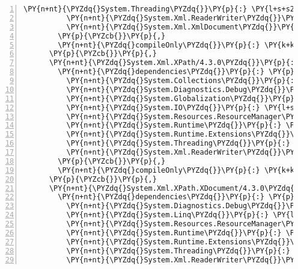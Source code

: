 \begin{Verbatim}[commandchars=\\\{\},numbers=left,firstnumber=1,stepnumber=1,numberblanklines=0]
          \PY{n+nt}{\PYZdq{}System.Threading\PYZdq{}}\PY{p}{:} \PY{l+s+s2}{\PYZdq{}4.3.0\PYZdq{}}\PY{p}{,}
          \PY{n+nt}{\PYZdq{}System.Xml.ReaderWriter\PYZdq{}}\PY{p}{:} \PY{l+s+s2}{\PYZdq{}4.3.0\PYZdq{}}\PY{p}{,}
          \PY{n+nt}{\PYZdq{}System.Xml.XmlDocument\PYZdq{}}\PY{p}{:} \PY{l+s+s2}{\PYZdq{}4.3.0\PYZdq{}}
        \PY{p}{\PYZcb{}}\PY{p}{,}
        \PY{n+nt}{\PYZdq{}compileOnly\PYZdq{}}\PY{p}{:} \PY{k+kc}{true}
      \PY{p}{\PYZcb{}}\PY{p}{,}
      \PY{n+nt}{\PYZdq{}System.Xml.XPath/4.3.0\PYZdq{}}\PY{p}{:} \PY{p}{\PYZob{}}
        \PY{n+nt}{\PYZdq{}dependencies\PYZdq{}}\PY{p}{:} \PY{p}{\PYZob{}}
          \PY{n+nt}{\PYZdq{}System.Collections\PYZdq{}}\PY{p}{:} \PY{l+s+s2}{\PYZdq{}4.3.0\PYZdq{}}\PY{p}{,}
          \PY{n+nt}{\PYZdq{}System.Diagnostics.Debug\PYZdq{}}\PY{p}{:} \PY{l+s+s2}{\PYZdq{}4.3.0\PYZdq{}}\PY{p}{,}
          \PY{n+nt}{\PYZdq{}System.Globalization\PYZdq{}}\PY{p}{:} \PY{l+s+s2}{\PYZdq{}4.3.0\PYZdq{}}\PY{p}{,}
          \PY{n+nt}{\PYZdq{}System.IO\PYZdq{}}\PY{p}{:} \PY{l+s+s2}{\PYZdq{}4.3.0\PYZdq{}}\PY{p}{,}
          \PY{n+nt}{\PYZdq{}System.Resources.ResourceManager\PYZdq{}}\PY{p}{:} \PY{l+s+s2}{\PYZdq{}4.3.0\PYZdq{}}\PY{p}{,}
          \PY{n+nt}{\PYZdq{}System.Runtime\PYZdq{}}\PY{p}{:} \PY{l+s+s2}{\PYZdq{}4.3.0\PYZdq{}}\PY{p}{,}
          \PY{n+nt}{\PYZdq{}System.Runtime.Extensions\PYZdq{}}\PY{p}{:} \PY{l+s+s2}{\PYZdq{}4.3.0\PYZdq{}}\PY{p}{,}
          \PY{n+nt}{\PYZdq{}System.Threading\PYZdq{}}\PY{p}{:} \PY{l+s+s2}{\PYZdq{}4.3.0\PYZdq{}}\PY{p}{,}
          \PY{n+nt}{\PYZdq{}System.Xml.ReaderWriter\PYZdq{}}\PY{p}{:} \PY{l+s+s2}{\PYZdq{}4.3.0\PYZdq{}}
        \PY{p}{\PYZcb{}}\PY{p}{,}
        \PY{n+nt}{\PYZdq{}compileOnly\PYZdq{}}\PY{p}{:} \PY{k+kc}{true}
      \PY{p}{\PYZcb{}}\PY{p}{,}
      \PY{n+nt}{\PYZdq{}System.Xml.XPath.XDocument/4.3.0\PYZdq{}}\PY{p}{:} \PY{p}{\PYZob{}}
        \PY{n+nt}{\PYZdq{}dependencies\PYZdq{}}\PY{p}{:} \PY{p}{\PYZob{}}
          \PY{n+nt}{\PYZdq{}System.Diagnostics.Debug\PYZdq{}}\PY{p}{:} \PY{l+s+s2}{\PYZdq{}4.3.0\PYZdq{}}\PY{p}{,}
          \PY{n+nt}{\PYZdq{}System.Linq\PYZdq{}}\PY{p}{:} \PY{l+s+s2}{\PYZdq{}4.3.0\PYZdq{}}\PY{p}{,}
          \PY{n+nt}{\PYZdq{}System.Resources.ResourceManager\PYZdq{}}\PY{p}{:} \PY{l+s+s2}{\PYZdq{}4.3.0\PYZdq{}}\PY{p}{,}
          \PY{n+nt}{\PYZdq{}System.Runtime\PYZdq{}}\PY{p}{:} \PY{l+s+s2}{\PYZdq{}4.3.0\PYZdq{}}\PY{p}{,}
          \PY{n+nt}{\PYZdq{}System.Runtime.Extensions\PYZdq{}}\PY{p}{:} \PY{l+s+s2}{\PYZdq{}4.3.0\PYZdq{}}\PY{p}{,}
          \PY{n+nt}{\PYZdq{}System.Threading\PYZdq{}}\PY{p}{:} \PY{l+s+s2}{\PYZdq{}4.3.0\PYZdq{}}\PY{p}{,}
          \PY{n+nt}{\PYZdq{}System.Xml.ReaderWriter\PYZdq{}}\PY{p}{:} \PY{l+s+s2}{\PYZdq{}4.3.0\PYZdq{}}\PY{p}{,}

\end{Verbatim}
